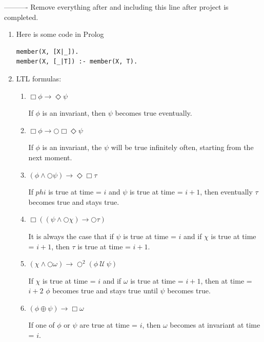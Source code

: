 \documentclass[12pt]{article}
\begin{document}
\noindent ---------- Remove everything after and including this line after project is completed.
\begin{enumerate}
\item Here is some code in Prolog
\begin{verbatim}
member(X, [X|_]).
member(X, [_|T]) :- member(X, T).
\end{verbatim}


\item LTL formulas:

\begin{enumerate}
	
	\item $\Box \phi \rightarrow \Diamond \psi $
	
	\noindent If $\phi$ is an invariant, then $\psi$ becomes true eventually.
	
	\item $\Box \phi \rightarrow \bigcirc \Box \Diamond \psi$
	
	\noindent If $\phi$ is an invariant, the $\psi$ will be true infinitely often, starting 	
	from the next moment.
	
	\item $(\phi \wedge \bigcirc \psi) \rightarrow \Diamond \Box \tau$	
	
	\noindent If $phi$ is true at time = $i$ and $\psi$ is true at time = $i + 1$,
	then eventually $\tau$ becomes true and stays true.
	
	\item $\Box (( \psi \wedge \bigcirc \chi) \rightarrow \bigcirc \tau)$
	
	\noindent It is always the case that if $\psi$ is true at time = $i$ and if $\chi$ is 	 
	true at time = $i + 1$, then $\tau$ is true at time = $i + 1.$
	
	\item $ (\chi \wedge \bigcirc \omega) \rightarrow \bigcirc^{2} ( \phi ~\mathcal{U}~ \psi )$
	
	\noindent If $\chi$ is true at time = $i$ and if $\omega$ is true at time = $i + 1$,
	then at time  = $i + 2$ $\phi$ becomes true and stays true until $\psi$ becomes 
	true.
	
	\item $( \phi \oplus \psi ) \rightarrow \Box \omega $
	
	\noindent If one of $\phi$ or $\psi$ are true at time = $i$, then $\omega$ becomes at
	invariant at time = $i.$	
	
	
\end{enumerate}



\end{enumerate}
\end{document}
